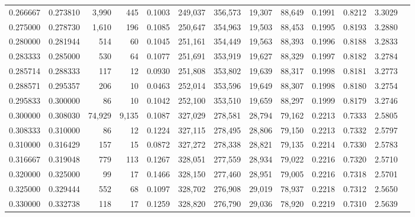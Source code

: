 \begin{tabular}{rrrrrrrrrrrrr}
0.266667 & 0.273810 &  3,990 &    445 &                                     0.1003 & 249,037 & 356,573 &  19,307 &  88,649 & 0.1991 & 0.8212 & 3.3029 \\
0.275000 & 0.278730 &  1,610 &    196 &                                     0.1085 & 250,647 & 354,963 &  19,503 &  88,453 & 0.1995 & 0.8193 & 3.2880 \\
0.280000 & 0.281944 &    514 &     60 &                                     0.1045 & 251,161 & 354,449 &  19,563 &  88,393 & 0.1996 & 0.8188 & 3.2833 \\
0.283333 & 0.285000 &    530 &     64 &                                     0.1077 & 251,691 & 353,919 &  19,627 &  88,329 & 0.1997 & 0.8182 & 3.2784 \\
0.285714 & 0.288333 &    117 &     12 &                                     0.0930 & 251,808 & 353,802 &  19,639 &  88,317 & 0.1998 & 0.8181 & 3.2773 \\
0.288571 & 0.295357 &    206 &     10 &                                     0.0463 & 252,014 & 353,596 &  19,649 &  88,307 & 0.1998 & 0.8180 & 3.2754 \\
0.295833 & 0.300000 &     86 &     10 &                                     0.1042 & 252,100 & 353,510 &  19,659 &  88,297 & 0.1999 & 0.8179 & 3.2746 \\
0.300000 & 0.308030 & 74,929 &  9,135 &                                     0.1087 & 327,029 & 278,581 &  28,794 &  79,162 & 0.2213 & 0.7333 & 2.5805 \\
0.308333 & 0.310000 &     86 &     12 &                                     0.1224 & 327,115 & 278,495 &  28,806 &  79,150 & 0.2213 & 0.7332 & 2.5797 \\
0.310000 & 0.316429 &    157 &     15 &                                     0.0872 & 327,272 & 278,338 &  28,821 &  79,135 & 0.2214 & 0.7330 & 2.5783 \\
0.316667 & 0.319048 &    779 &    113 &                                     0.1267 & 328,051 & 277,559 &  28,934 &  79,022 & 0.2216 & 0.7320 & 2.5710 \\
0.320000 & 0.325000 &     99 &     17 &                                     0.1466 & 328,150 & 277,460 &  28,951 &  79,005 & 0.2216 & 0.7318 & 2.5701 \\
0.325000 & 0.329444 &    552 &     68 &                                     0.1097 & 328,702 & 276,908 &  29,019 &  78,937 & 0.2218 & 0.7312 & 2.5650 \\
0.330000 & 0.332738 &    118 &     17 &                                     0.1259 & 328,820 & 276,790 &  29,036 &  78,920 & 0.2219 & 0.7310 & 2.5639 \\

\end{tabular}

